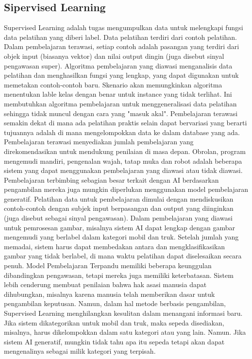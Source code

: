 \subsection{Sipervised Learning}Supervised Learning adalah tugas mengumpulkan data untuk melengkapi fungsi data pelatihan yang diberi label. Data pelatihan terdiri dari contoh pelatihan. Dalam pembelajaran terawasi, setiap contoh adalah pasangan yang terdiri dari objek input (biasanya vektor) dan nilai output dingin (juga disebut sinyal pengawasan super). Algoritma pembelajaran yang diawasi menganalisis data pelatihan dan menghasilkan fungsi yang lengkap, yang dapat digunakan untuk memetakan contoh-contoh baru. Skenario  akan memungkinkan algoritma menentukan lable kelas dengan benar untuk instance yang tidak terlihat. Ini membutuhkan algoritma pembelajaran untuk menggeneralisasi data pelatihan sehingga tidak muncul dengan cara yang "masuk akal". Pembelajaran terawasi semakin dekat di mana ada pelatihan praktis selain dapat bervariasi yang berarti tujuannya adalah di mana mengelompokkan data ke dalam database yang ada. Pembelajaran terawasi menyediakan jumlah pembelajaran yang direkomendasikan untuk mendukung penilaian di masa depan. Obrolan, program mengemudi mandiri, pengenalan wajah, tatap muka dan robot adalah beberapa sistem yang dapat menggunakan pembelajaran yang diawasi atau tidak diawasi. Pembelajaran terbimbing sebagian besar terkait dengan AI berdasarkan pengambilan mereka juga mungkin diperlukan menggunakan model pembelajaran generatif. Pelatihan data untuk pembelajaran dimulai dengan mendiskusikan contoh-contoh dengan subjek input berpasangan dan output yang diinginkan (juga disebut sebagai sinyal pengawasan). Dalam pembelajaran yang diawasi untuk pemrosesan gambar, misalnya sistem AI dapat lengkap dengan gambar mengemudi yang berlabel dalam kategori mobil dan truk. Setelah jumlah yang memadai, sistem harus dapat membedakan antara dan mengklasifikasikan gambar yang tidak berlabel, di mana waktu pelatihan dapat diselesaikan secara penuh. Model Pembelajaran Terpandu memiliki beberapa keunggulan dibandingkan pengawasan, tetapi mereka juga memiliki keterbatasan. Sistem lebih cenderung membuat penilaian bahwa hak asasi manusia dapat dihubungkan, misalnya karena manusia telah memberikan dasar untuk pengambilan keputusan. Namun, dalam hal metode berbasis pengambilan, Supervised Learning menghilangkan kesulitan dalam menangani informasi baru. Jika sistem dikategorikan untuk mobil dan truk, maka sepeda disediakan, misalnya, harus dikelompokkan dalam satu kategori atau yang lain. Namun. Jika sistem AI generatif, mungkin tidak tahu apa itu sepeda tetapi akan dapat mengenalinya sebagai milik kategori yang terpisah.
